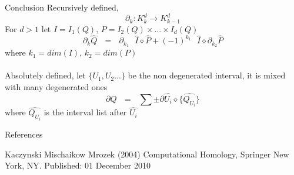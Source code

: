 \documentclass[aspectratio=169,xcolor=dvipsnames]{beamer}
\begin{document}
\begin{frame}{Conclusion}
Recursively defined,
    $$\partial_k \colon K^d_k \longrightarrow K^d_{k-1}$$
For $d>1$ let $I = I_1(Q)$, $P= I_2(Q) \times ... \times I_d(Q)$
$$\partial_k \widehat{Q}\text{ } =\text{ } \partial_k_1 \text{ } \widehat{I} \diamond \widehat{P} + (-1)^{k_1} \text{ }\widehat{I} \diamond \partial_k_2 \widehat{P}$$
where $k_1 = dim(I)$, $k_2=dim(P)$ \\
\\[10pt]
Absolutely defined, let $\{U_1,U_2 ...\}$ be the non degenerated interval, it is mixed with many degenerated ones\\
$$\partial \widehat{Q}\text{ } =\text{ } \sum \pm \partial \widehat{U_i} \diamond \{\widehat{Q_U_i}\} $$
where $\widehat{Q_U_i}$ is the interval list after $\widehat{U_i}$
\end{frame}




\begin{frame}{References}
    \footnotesize{
        \begin{thebibliography}{99}
            \bibitem[, 2004]{} Kaczynski Mischaikow Mrozek (2004)
            \newblock Computational Homology, Springer New York, NY. Published: 01 December 2010
        \end{thebibliography}
    }
\end{frame}
\end{document}
